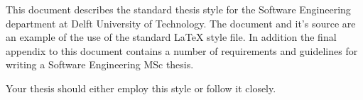 This document describes the standard thesis style for the Software Engineering department at Delft University of Technology. The document and it's source are an example of the use of the standard LaTeX style file. In addition the final appendix to this document contains a number of requirements and guidelines for writing a Software Engineering MSc thesis.

Your thesis should either employ this style or follow it closely.
